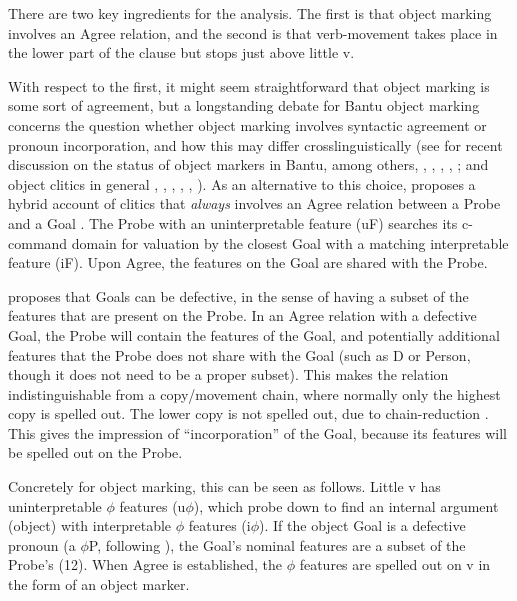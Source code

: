 \documentclass[output=paper
,modfonts
,nonflat]{langsci/langscibook}
\begin{document}
There are two key ingredients for the analysis. The first is that object marking involves an Agree relation, and the second is that verb-movement takes place in the lower part of the clause but stops just above little v.

With respect to the first, it might seem straightforward that object marking is some sort of agreement, but a longstanding debate for Bantu object marking concerns the question whether object marking involves syntactic agreement or pronoun incorporation, and how this may differ crosslinguistically (see for recent discussion on the status of object markers in Bantu, among others, \citealt{Henderson2006}, \citealt{Riedel2009}, \citealt{Zeller2012}, \citealt{Iorio2014}, \citealt{Baker2016}; and object clitics in general \citealt{Preminger2009}, \citealt{Nevins2011}, \citealt{Anagnostopoulou2014, Anagnostopoulou2016}, \citealt{Kramer2014}, \citealt{Harizanov2014}, \citealt{Baker_Kramer2016}). As an alternative to this choice, \citet{Roberts2010} proposes a hybrid account of clitics that \textit{always} involves an Agree relation between a Probe and a Goal \citep{Chomsky2000, Chomsky2001}. The Probe with an uninterpretable feature (uF) searches its c-command domain for valuation by the closest Goal with a matching interpretable feature (iF). Upon Agree, the features on the Goal are shared with the Probe.

\citet{Roberts2010} proposes that Goals can be defective, in the sense of having a subset of the features that are present on the Probe. In an Agree relation with a defective Goal, the Probe will contain the features of the Goal, and potentially additional features that the Probe does not share with the Goal (such as D or Person, though it does not need to be a proper subset). This makes the relation indistinguishable from a copy/movement chain, where normally only the highest copy is spelled out. The lower copy is not spelled out, due to chain-reduction \citep{Nunes2004}. This gives the impression of “incorporation” of the Goal, because its features will be spelled out on the Probe.

Concretely for object marking, this can be seen as follows. Little v has uninterpretable $\phi $ features (u$\phi$), which probe down to find an internal argument (object) with interpretable $\phi$ features (i$\phi$). If the object Goal is a defective pronoun (a $\phi$P, following \citealt{Déchaine_Wiltschko2002}), the Goal’s nominal features are a subset of the Probe’s (12). When Agree is established, the $\phi$ features are spelled out on v in the form of an object marker.
\end{document}
